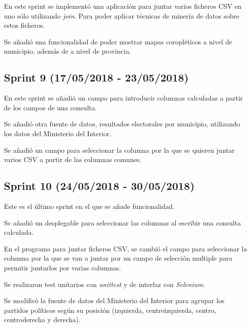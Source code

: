 En este sprint se implementó una aplicación para juntar varios ficheros CSV en uno sólo utilizando \textit{join}. Para poder aplicar técnicas de minería de datos sobre estos ficheros.

Se añadió una funcionalidad de poder mostrar mapas coropléticos a nivel de municipio, además de a nivel de provincia.



\subsection{Sprint 9 (17/05/2018 - 23/05/2018)}

En este sprint se añadió un campo para introducir columnas calculadas a partir de los campos de una consulta. 

Se añadió otra fuente de datos, resultados electorales por municipio, utilizando los datos del Ministerio del Interior.

Se añadió un campo para seleccionar la columna por la que se quieren juntar varios CSV a partir de las columnas comunes.



\subsection{Sprint 10 (24/05/2018 - 30/05/2018)}

Este es el último sprint en el que se añade funcionalidad.

Se añadió un desplegable para seleccionar las columnas al escribir una consulta calculada.

En el programa para juntar ficheros CSV, se cambió el campo para seleccionar la columna por la que se van a juntar por un campo de selección multiple para permitir juntarlos por varias columnas.

Se realizaron test unitarios con \textit{unittest} y de interfaz con \textit{Selenium}.

Se modificó la fuente de datos del Ministerio del Interior para agrupar los partidos políticos según su posición (izquierda, centroizquierda, centro, centroderecha y derecha).

